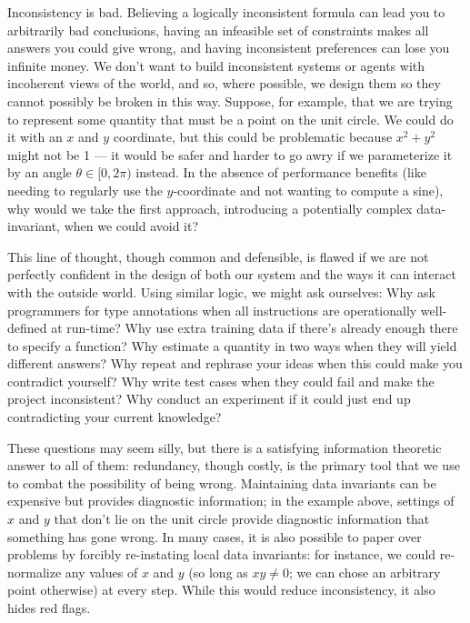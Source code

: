 \documentclass{article}
\begin{document}
	Inconsistency is bad. Believing a logically inconsistent formula can lead you to arbitrarily bad conclusions, having an infeasible set of constraints makes all answers you could give wrong, and having inconsistent preferences can lose you infinite money. We don't want to build inconsistent systems or agents with incoherent views of the world, and so, where possible, we design them so they cannot possibly be broken in this way. Suppose, for example, that we are trying to represent some quantity that must be a point on the unit circle. We could do it with an $x$ and $y$ coordinate, but this could be problematic because $x^2+ y^2$ might not be 1 --- it would be safer and harder to go awry if we parameterize it by an angle $\theta \in [0, 2\pi)$ instead. In the absence of performance benefits (like needing to regularly use the $y$-coordinate and not wanting to compute a sine), why would we take the first approach, introducing a potentially complex data-invariant, when we could avoid it?
	
	This line of thought, though common and defensible, is flawed if we are not perfectly confident in the design of both our system and the ways it can interact with the outside world. Using similar logic, we might ask ourselves: Why ask programmers for type annotations when all instructions are operationally well-defined at run-time?  Why use extra training data if there's already enough there to specify a function? Why estimate a quantity in two ways when they will yield different answers? Why repeat and rephrase your ideas when this could make you contradict yourself? Why write test cases when they could fail and make the project inconsistent? Why conduct an experiment if it could just end up contradicting your current knowledge?
	
	These questions may seem silly, but there is a satisfying information theoretic answer to all of them: redundancy, though costly, is the primary tool that we use to combat the possibility of being wrong. Maintaining data invariants can be expensive but provides diagnostic information; in the example above, settings of $x$ and $y$ that don't lie on the unit circle provide diagnostic information that something has gone wrong.
	In many cases, it is also possible to paper over problems by forcibly re-instating local data invariants: for instance, we could re-normalize any values of $x$ and $y$ (so long as $xy \neq 0$; we can chose an arbitrary point otherwise) at every step. While this would reduce inconsistency, it also hides red flags.
	
\end{document}
